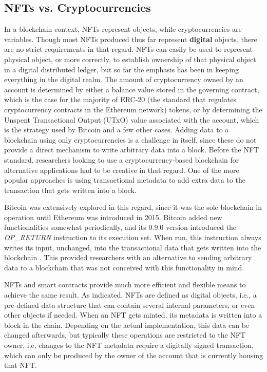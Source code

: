 \documentclass[../3_VotingAndNFTs.tex]{subfiles}
\begin{document}
        \subsection{NFTs vs. Cryptocurrencies}
        In a blockchain context, NFTs represent objects, while cryptocurrencies are variables. Though most NFTs produced thus far represent \textbf{digital} objects, there are no strict requirements in that regard. NFTs can easily be used to represent physical object, or more correctly, to establish ownership of that physical object in a digital distributed ledger, but so far the emphasis has been in keeping everything in the digital realm. The amount of cryptocurrency owned by an account is determined by either a balance value stored in the governing contract, which is the case for the majority of ERC-20 (the standard that regulates cryptocurrency contracts in the Ethereum network) tokens, or by determining the Unspent Transactional Output (UTxO) value associated with the account, which is the strategy used by Bitcoin and a few other cases. Adding data to a blockchain using only cryptocurrencies is a challenge in itself, since these do not provide a direct mechanism to write arbitrary data into a block. Before the NFT standard, researchers looking to use a cryptocurrency-based blockchain for alternative applications had to be creative in that regard. One of the more popular approaches is using transactional metadata to add extra data to the transaction that gets written into a block.
        \par
        Bitcoin was extensively explored in this regard, since it was the sole blockchain in operation until Ethereum was introduced in 2015. Bitcoin added new functionalities somewhat periodically, and its $ 0.9.0 $ version introduced the \textit{OP\_RETURN} instruction to its execution set. When run, this instruction always writes its input, unchanged, into the transactional data that gets written into the blockchain \cite{Bartoletti2017}. This provided researchers with an alternative to sending arbitrary data to a blockchain that was not conceived with this functionality in mind.
        \par
        NFTs and smart contracts provide much more efficient and flexible means to achieve the same result. As indicated, NFTs are defined as digital objects, i.e., a pre-defined data structure that can contain several internal parameters, or even other objects if needed. When an NFT gets minted, its metadata is written into a block in the chain. Depending on the actual implementation, this data can be changed afterwards, but typically these operations are restricted to the NFT owner, i.e, changes to the NFT metadata require a digitally signed transaction, which can only be produced by the owner of the account that is currently housing that NFT.
        
\end{document}
